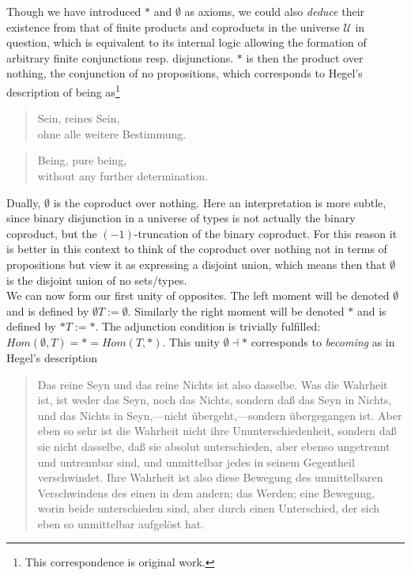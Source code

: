 \documentclass{article}
\begin{document}
Though we have introduced $*$ and $\emptyset$ as axioms, we could also \emph{deduce} their existence from that of finite products and coproducts in the universe $\mathcal{U}$ in question, which is equivalent to its internal logic allowing the formation of arbitrary finite conjunctions resp. disjunctions. $*$ is then the product over nothing, the conjunction of no propositions, which corresponds to Hegel's description of being as\footnote{This correspondence is original work.} 

\begin{quote}
    Sein, reines Sein, \\
    ohne alle weitere Bestimmung.
\end{quote}

\begin{quote}
    Being, pure being, \\ 
    without any further determination.
\end{quote}

 

Dually, $\emptyset$ is the coproduct over nothing. Here an interpretation is more subtle, since binary disjunction in a universe of types is not actually the binary coproduct, but the $(-1)$-truncation of the binary coproduct. For this reason it is better in this context to think of the coproduct over nothing not in terms of propositions but view it as expressing a disjoint union, which means then that $\emptyset$ is the disjoint union of no sets/types. \\

We can now form our first unity of opposites. The left moment will be denoted $\emptyset$ and is defined by $\emptyset T:= \emptyset$. Similarly the right moment will be denoted $*$ and is defined by $* T:= *$. The adjunction condition is trivially fulfilled: $Hom(\emptyset, T)=*=Hom(T, *)$. This unity $\emptyset\dashv *$ corresponds to \emph{becoming} as in Hegel's description

\begin{quote}
    Das reine Seyn und das reine Nichts ist also dasselbe. Was die Wahrheit ist, ist weder das Seyn, noch das Nichts, sondern daß das Seyn in Nichts, und das Nichts in Seyn,—nicht übergeht,—sondern übergegangen ist. Aber eben so sehr ist die Wahrheit nicht ihre Ununterschiedenheit, sondern daß sie nicht dasselbe, daß sie absolut unterschieden, aber ebenso ungetrennt und untrennbar sind, und unmittelbar jedes in seinem Gegentheil verschwindet. Ihre Wahrheit ist also diese Bewegung des unmittelbaren Verschwindens des einen in dem andern; das Werden; eine Bewegung, worin beide unterschieden sind, aber durch einen Unterschied, der sich eben so unmittelbar aufgelöst hat.
\end{quote}
\end{document}
